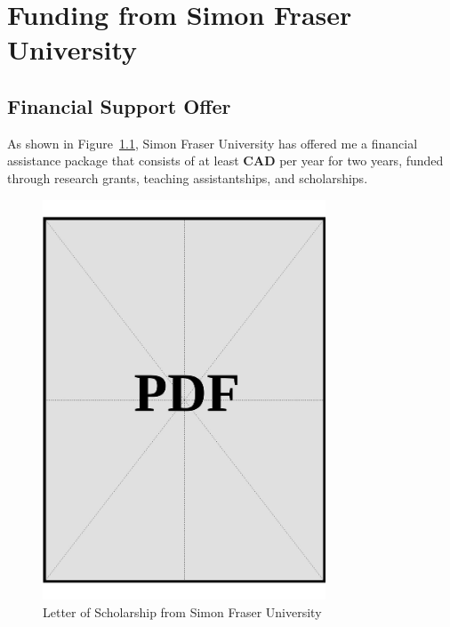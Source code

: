 \chapter{Funding from Simon Fraser University}
\label{sec:university-funding-sources}

\section{Financial Support Offer}\label{sec:university-funding-letter}

As shown in Figure~\ref{fig:scholarship-letter}, Simon Fraser University has offered me a financial assistance package that consists of at least \textbf{CAD \universityFunds} per year for two years, funded through research grants, teaching assistantships, and scholarships.

\vspace*{\fill}
\begin{figure}[h]
    \centering
    \includegraphics[page=1,width=0.75\textwidth]{../docs/applicant/canadian-institution/letter-of-scholarship.pdf}
    \caption{Letter of Scholarship from Simon Fraser University}
    \label{fig:scholarship-letter}
\end{figure}
\vspace*{\fill}

